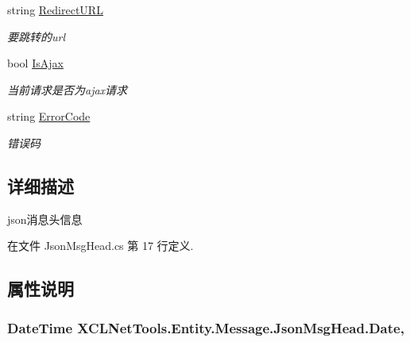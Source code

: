 \begin{DoxyCompactItemize}
string \hyperlink{class_x_c_l_net_tools_1_1_entity_1_1_message_1_1_json_msg_head_aa3e8eb7bf16a7a3abea7e7797488685e}{Redirect\+U\+RL}
\begin{DoxyCompactList}\small\item\em 要跳转的url \end{DoxyCompactList}\item 
bool \hyperlink{class_x_c_l_net_tools_1_1_entity_1_1_message_1_1_json_msg_head_adedb9cb59037071c879572360cebc574}{Is\+Ajax}
\begin{DoxyCompactList}\small\item\em 当前请求是否为ajax请求 \end{DoxyCompactList}\item 
string \hyperlink{class_x_c_l_net_tools_1_1_entity_1_1_message_1_1_json_msg_head_a0f5effef61535ac1a2560f9c47eaea17}{Error\+Code}
\begin{DoxyCompactList}\small\item\em 错误码 \end{DoxyCompactList}\end{DoxyCompactItemize}


\subsection{详细描述}
json消息头信息 



在文件 Json\+Msg\+Head.\+cs 第 17 行定义.



\subsection{属性说明}
\subsubsection[{\texorpdfstring{Date}{Date}}]{\setlength{\rightskip}{0pt plus 5cm}Date\+Time X\+C\+L\+Net\+Tools.\+Entity.\+Message.\+Json\+Msg\+Head.\+Date\hspace{0.3cm}{\ttfamily [get]}, {\ttfamily [set]}}\hypertarget{class_x_c_l_net_tools_1_1_entity_1_1_message_1_1_json_msg_head_ae57b40b25eb4db28d428134d33358c90}{}\label{class_x_c_l_net_tools_1_1_entity_1_1_message_1_1_json_msg_head_ae57b40b25eb4db28d428134d33358c90}


